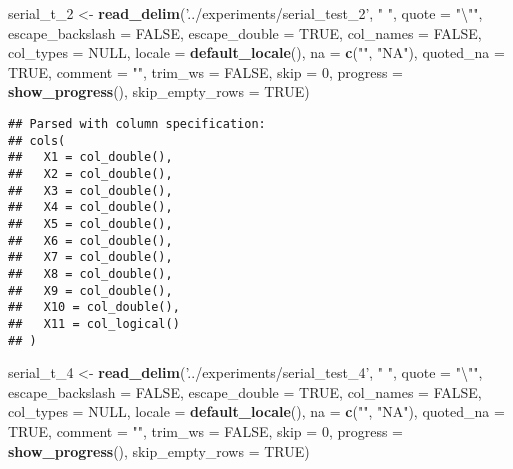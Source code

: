 \documentclass[]{article}
\newenvironment{Shaded}{\begin{snugshade}}{\end{snugshade}}
\newcommand{\KeywordTok}[1]{\textcolor[rgb]{0.13,0.29,0.53}{\textbf{#1}}}
\newcommand{\DataTypeTok}[1]{\textcolor[rgb]{0.13,0.29,0.53}{#1}}
\newcommand{\DecValTok}[1]{\textcolor[rgb]{0.00,0.00,0.81}{#1}}
\newcommand{\CharTok}[1]{\textcolor[rgb]{0.31,0.60,0.02}{#1}}
\newcommand{\StringTok}[1]{\textcolor[rgb]{0.31,0.60,0.02}{#1}}
\newcommand{\OtherTok}[1]{\textcolor[rgb]{0.56,0.35,0.01}{#1}}
\newcommand{\NormalTok}[1]{#1}
\begin{document}
\begin{Shaded}
\begin{Highlighting}[]
\NormalTok{serial_t_}\DecValTok{2}\NormalTok{ <-}\StringTok{ }\KeywordTok{read_delim}\NormalTok{(}\StringTok{'../experiments/serial_test_2'}\NormalTok{, }\StringTok{" "}\NormalTok{, }\DataTypeTok{quote =} \StringTok{"}\CharTok{\textbackslash{}"}\StringTok{"}\NormalTok{, }\DataTypeTok{escape_backslash =} \OtherTok{FALSE}\NormalTok{,}
  \DataTypeTok{escape_double =} \OtherTok{TRUE}\NormalTok{, }\DataTypeTok{col_names =} \OtherTok{FALSE}\NormalTok{, }\DataTypeTok{col_types =} \OtherTok{NULL}\NormalTok{,}
  \DataTypeTok{locale =} \KeywordTok{default_locale}\NormalTok{(), }\DataTypeTok{na =} \KeywordTok{c}\NormalTok{(}\StringTok{""}\NormalTok{, }\StringTok{"NA"}\NormalTok{), }\DataTypeTok{quoted_na =} \OtherTok{TRUE}\NormalTok{,}
  \DataTypeTok{comment =} \StringTok{""}\NormalTok{, }\DataTypeTok{trim_ws =} \OtherTok{FALSE}\NormalTok{, }\DataTypeTok{skip =} \DecValTok{0}\NormalTok{, }
 \DataTypeTok{progress =} \KeywordTok{show_progress}\NormalTok{(),}
  \DataTypeTok{skip_empty_rows =} \OtherTok{TRUE}\NormalTok{)}
\end{Highlighting}
\end{Shaded}

\begin{verbatim}
## Parsed with column specification:
## cols(
##   X1 = col_double(),
##   X2 = col_double(),
##   X3 = col_double(),
##   X4 = col_double(),
##   X5 = col_double(),
##   X6 = col_double(),
##   X7 = col_double(),
##   X8 = col_double(),
##   X9 = col_double(),
##   X10 = col_double(),
##   X11 = col_logical()
## )
\end{verbatim}

\begin{Shaded}
\begin{Highlighting}[]
\NormalTok{serial_t_}\DecValTok{4}\NormalTok{ <-}\StringTok{ }\KeywordTok{read_delim}\NormalTok{(}\StringTok{'../experiments/serial_test_4'}\NormalTok{, }\StringTok{" "}\NormalTok{, }\DataTypeTok{quote =} \StringTok{"}\CharTok{\textbackslash{}"}\StringTok{"}\NormalTok{, }\DataTypeTok{escape_backslash =} \OtherTok{FALSE}\NormalTok{,}
  \DataTypeTok{escape_double =} \OtherTok{TRUE}\NormalTok{, }\DataTypeTok{col_names =} \OtherTok{FALSE}\NormalTok{, }\DataTypeTok{col_types =} \OtherTok{NULL}\NormalTok{,}
  \DataTypeTok{locale =} \KeywordTok{default_locale}\NormalTok{(), }\DataTypeTok{na =} \KeywordTok{c}\NormalTok{(}\StringTok{""}\NormalTok{, }\StringTok{"NA"}\NormalTok{), }\DataTypeTok{quoted_na =} \OtherTok{TRUE}\NormalTok{,}
  \DataTypeTok{comment =} \StringTok{""}\NormalTok{, }\DataTypeTok{trim_ws =} \OtherTok{FALSE}\NormalTok{, }\DataTypeTok{skip =} \DecValTok{0}\NormalTok{, }
 \DataTypeTok{progress =} \KeywordTok{show_progress}\NormalTok{(),}
  \DataTypeTok{skip_empty_rows =} \OtherTok{TRUE}\NormalTok{)}
\end{Highlighting}
\end{Shaded}
\end{document}

